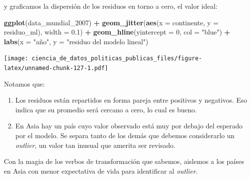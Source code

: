 \documentclass[]{book}
\newenvironment{Shaded}{\begin{snugshade}}{\end{snugshade}}
\newcommand{\KeywordTok}[1]{\textcolor[rgb]{0.13,0.29,0.53}{\textbf{#1}}}
\newcommand{\DataTypeTok}[1]{\textcolor[rgb]{0.13,0.29,0.53}{#1}}
\newcommand{\DecValTok}[1]{\textcolor[rgb]{0.00,0.00,0.81}{#1}}
\newcommand{\FloatTok}[1]{\textcolor[rgb]{0.00,0.00,0.81}{#1}}
\newcommand{\StringTok}[1]{\textcolor[rgb]{0.31,0.60,0.02}{#1}}
\newcommand{\OperatorTok}[1]{\textcolor[rgb]{0.81,0.36,0.00}{\textbf{#1}}}
\newcommand{\NormalTok}[1]{#1}
\providecommand{\tightlist}{%
  \setlength{\itemsep}{0pt}\setlength{\parskip}{0pt}}
\begin{document}
y graficamos la dispersión de los residuos en torno a cero, el valor
ideal:

\begin{Shaded}
\begin{Highlighting}[]
\KeywordTok{ggplot}\NormalTok{(data_mundial_}\DecValTok{2007}\NormalTok{) }\OperatorTok{+}
\StringTok{    }\KeywordTok{geom_jitter}\NormalTok{(}\KeywordTok{aes}\NormalTok{(}\DataTypeTok{x =}\NormalTok{ continente, }\DataTypeTok{y =}\NormalTok{ residuo_ml), }\DataTypeTok{width =} \FloatTok{0.1}\NormalTok{) }\OperatorTok{+}
\StringTok{    }\KeywordTok{geom_hline}\NormalTok{(}\DataTypeTok{yintercept =} \DecValTok{0}\NormalTok{, }\DataTypeTok{col =} \StringTok{"blue"}\NormalTok{) }\OperatorTok{+}
\StringTok{    }\KeywordTok{labs}\NormalTok{(}\DataTypeTok{x =} \StringTok{"año"}\NormalTok{, }\DataTypeTok{y =} \StringTok{"residuo del modelo lineal"}\NormalTok{)}
\end{Highlighting}
\end{Shaded}

\texttt{[image: ciencia\_de\_datos\_politicas\_publicas\_files/figure-latex/unnamed-chunk-127-1.pdf]}

Notamos que:

\begin{enumerate}
\def\labelenumi{\arabic{enumi}.}
\tightlist
\item
  Los residuos están repartidos en forma pareja entre positivos y
  negativos. Eso indica que su promedio será cercano a cero, lo cual es
  bueno.
\item
  En Asia hay un país cuyo valor observado está muy por debajo del
  esperado por el modelo. Se separa tanto de los demás que debemos
  considerarlo un \emph{outlier}, un valor tan inusual que amerita ser
  revisado.
\end{enumerate}

Con la magia de los verbos de transformación que sabemos, aislemos a los
países en Asia con menor expectativa de vida para identificar al
\emph{outlier}.

\begin{Shaded}
\end{Shaded}
\end{document}
